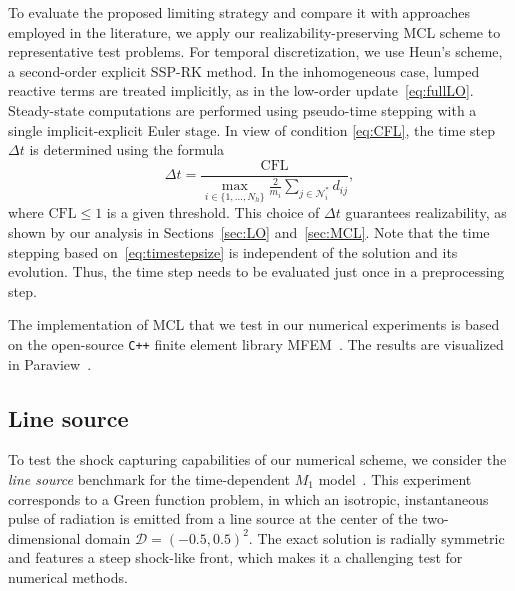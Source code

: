 \documentclass[preprint, 11pt]{elsarticle}
\newcommand{\N}{\mathcal{N}}
\newcommand{\D}{\mathcal{D}}
\begin{document}
To evaluate the proposed limiting strategy and compare it with approaches employed in the literature, we apply our realizability-preserving MCL scheme to representative test problems. For temporal discretization, we use Heun's scheme, a second-order explicit SSP-RK method. In the inhomogeneous case, lumped reactive terms are treated implicitly, as in the low-order update~\eqref{eq:fullLO}. Steady-state computations are performed using pseudo-time stepping with a single implicit-explicit Euler stage. In view of condition \eqref{eq:CFL}, the time step $\Delta t$ is determined using the formula~\cite{guermond2016, kuzmin2020, kuzmin2023} 
\begin{equation}\label{eq:timestepsize}
 \Delta t
  = \frac{\mathrm{CFL}}{\max_{i\in\{1,\ldots,N_h\}}\frac{2}{m_i}\sum_{j\in\N^*_i}d_{ij}},
\end{equation}
where $\mathrm{CFL} \leq 1$ is a given threshold.
This choice of $\Delta t$ guarantees realizability, as shown by our analysis in Sections~\ref{sec:LO} and~\ref{sec:MCL}.
Note that the time stepping based on~\eqref{eq:timestepsize} is independent of the solution and its evolution. 
Thus, the time step needs to be evaluated just once in a preprocessing step.

The implementation of MCL that we test in our numerical experiments is based on the open-source \texttt{C++} finite element library MFEM~\cite{anderson2021,andrej2024,mfem}. The results are visualized in Paraview~\cite{ayachit2015}.

\subsection{Line source}
To test the shock capturing capabilities of our numerical scheme, we consider the \emph{line source} benchmark for the time-dependent $M_1$ model~\cite{brunner2005}.
This experiment corresponds to a Green function problem, in which an isotropic, instantaneous pulse of radiation is emitted from a line source at the center of the two-dimensional domain $\D = (-0.5,0.5)^2$.  
The exact solution is radially symmetric and features a steep shock-like front, which makes it a challenging test for numerical methods.
\end{document}
